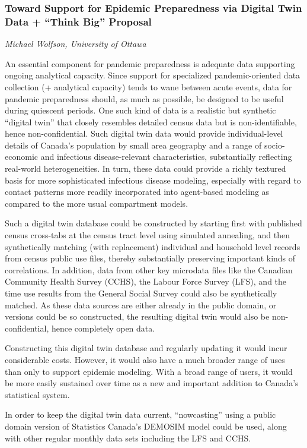 \subsubsection*{Toward Support for Epidemic Preparedness via Digital Twin Data
+ ``Think Big''
Proposal}
\textit{Michael Wolfson, University of Ottawa}

An essential component for pandemic preparedness is adequate data
supporting ongoing analytical capacity. Since support for specialized
pandemic-oriented data collection (+ analytical capacity) tends to wane
between acute events, data for pandemic preparedness should, as much as
possible, be designed to be useful during quiescent periods. One such
kind of data is a realistic but synthetic ``digital twin'' that closely
resembles detailed census data but is non-identifiable, hence
non-confidential. Such digital twin data would provide individual-level
details of Canada's population by small area geography and a range of
socio-economic and infectious disease-relevant characteristics,
substantially reflecting real-world heterogeneities. In turn, these data
could provide a richly textured basis for more sophisticated infectious
disease modeling, especially with regard to contact patterns more
readily incorporated into agent-based modeling as compared to the more
usual compartment models.

Such a digital twin database could be constructed by starting first with
published census cross-tabs at the census tract level using simulated
annealing, and then synthetically matching (with replacement) individual
and household level records from census public use files, thereby
substantially preserving important kinds of correlations. In addition,
data from other key microdata files like the Canadian Community Health
Survey (CCHS), the Labour Force Survey (LFS), and the time use results
from the General Social Survey could also be synthetically matched. As
these data sources are either already in the public domain, or versions
could be so constructed, the resulting digital twin would also be
non-confidential, hence completely open data.

Constructing this digital twin database and regularly updating it would
incur considerable costs. However, it would also have a much broader
range of uses than only to support epidemic modeling. With a broad range
of users, it would be more easily sustained over time as a new and
important addition to Canada's statistical system.

In order to keep the digital twin data current, ``nowcasting'' using a
public domain version of Statistics Canada's DEMOSIM model could be
used, along with other regular monthly data sets including the LFS and
CCHS.

